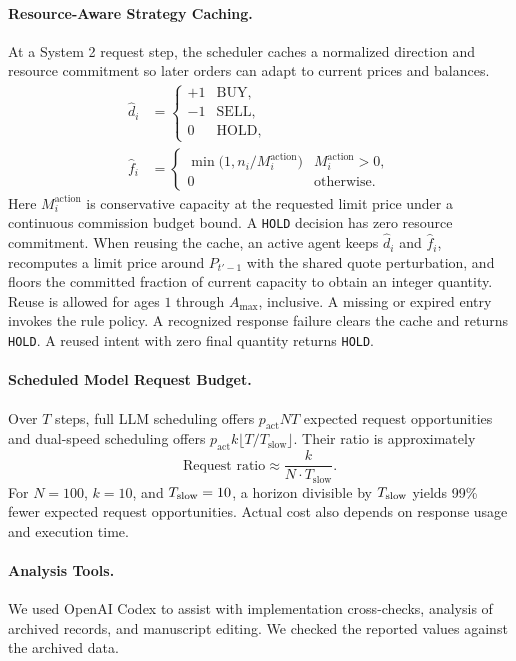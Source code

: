 \paragraph{Resource-Aware Strategy Caching.} At a System 2 request step, the scheduler caches a normalized direction and resource commitment so later orders can adapt to current prices and balances.
\begin{equation}
\begin{aligned}
 \widehat d_i &=
 \begin{cases}
   +1 & \mathrm{BUY}, \\
   -1 & \mathrm{SELL}, \\
   0 & \mathrm{HOLD},
 \end{cases} \\
 \widehat f_i &=
 \begin{cases}
   \min\!\bigl(1,n_i/M_i^{\mathrm{action}}\bigr) & M_i^{\mathrm{action}}>0, \\
   0 & \text{otherwise.}
 \end{cases}
\end{aligned}
  \label{eq:cache_signature}
\end{equation}
Here $M_i^{\mathrm{action}}$ is conservative capacity at the requested limit price under a continuous commission budget bound. A \texttt{HOLD} decision has zero resource commitment. When reusing the cache, an active agent keeps $\widehat d_i$ and $\widehat f_i$, recomputes a limit price around $P_{t'-1}$ with the shared quote perturbation, and floors the committed fraction of current capacity to obtain an integer quantity. Reuse is allowed for ages $1$ through $A_{\max}$, inclusive. A missing or expired entry invokes the rule policy. A recognized response failure clears the cache and returns \texttt{HOLD}. A reused intent with zero final quantity returns \texttt{HOLD}.

\paragraph{Scheduled Model Request Budget.} Over $T$ steps, full LLM scheduling offers $p_{\mathrm{act}}NT$ expected request opportunities and dual-speed scheduling offers $p_{\mathrm{act}}k\lfloor T/T_{\mathrm{slow}}\rfloor$. Their ratio is approximately
\begin{equation}
  \text{Request ratio} \approx \frac{k}{N \cdot T_{\mathrm{slow}}}.
  \label{eq:cost_ratio}
\end{equation}
For $N=100$, $k=10$, and $T_{\rm slow}=10$, a horizon divisible by $T_{\rm slow}$ yields 99\% fewer expected request opportunities. Actual cost also depends on response usage and execution time.
\paragraph{Analysis Tools.} We used OpenAI Codex to assist with implementation cross-checks, analysis of archived records, and manuscript editing. We checked the reported values against the archived data.
